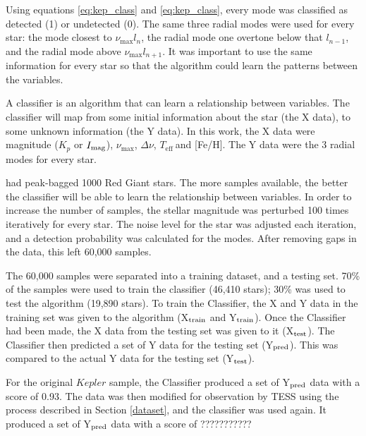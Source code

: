 \documentclass[a4paper,fleqn,usenatbib,useAMS]{mnras}
\newcommand{\numax}{\ensuremath{\nu_{\textrm{max}}}}
\newcommand{\dnu}{\ensuremath{\Delta\nu}}
\newcommand{\teff}{\ensuremath{T_{\textrm{eff}}\:}}
\begin{document}
Using equations \ref{eq:kep_class} and \ref{eq:kep_class}, every mode was classified as detected (1) or undetected (0). The same three radial modes were used for every star: the mode closest to \numax $l_{n}$, the radial mode one overtone below that $l_{n-1}$, and the radial mode above \numax $l_{n+1}$. It was important to use the same information for every star so that the algorithm could learn the patterns between the variables.

A classifier is an algorithm that can learn a relationship between variables. The classifier will map from some initial information about the star (the X data), to some unknown information (the Y data). In this work, the X data were magnitude ($K_{p}$ or $I_{\rm mag}$), \numax, \dnu, \teff and [Fe/H]. The Y data were the 3 radial modes for every star.

\citep{davies_asteroseismology_2016} had peak-bagged 1000 Red Giant stars. The more samples available, the better the classifier will be able to learn the relationship between variables. In order to increase the number of samples, the stellar magnitude was perturbed 100 times iteratively for every star. The noise level for the star was adjusted each iteration, and a detection probability was calculated for the modes. After removing gaps in the data, this left 60,000 samples.

The 60,000 samples were separated into a training dataset, and a testing set. 70\% of the samples were used to train the classifier (46,410 stars); 30\% was used to test the algorithm (19,890 stars). To train the Classifier, the X and Y data in the training set was given to the algorithm (X$_{\rm train}$ and Y$_{\rm train}$). Once the Classifier had been made, the X data from the testing set was given to it (X$_{\rm test}$). The Classifier then predicted a set of Y data for the testing set (Y$_{\rm pred}$). This was compared to the actual Y data for the testing set (Y$_{\rm test}$).

For the original $Kepler$ sample, the Classifier produced a set of Y$_{\rm pred}$ data with a score of 0.93. The data was then modified for observation by TESS using the process described in Section \ref{dataset}, and the classifier was used again. It produced a set of Y$_{\rm pred}$ data with a score of ???????????


















\bsp
\label{lastpage}
\end{document}
